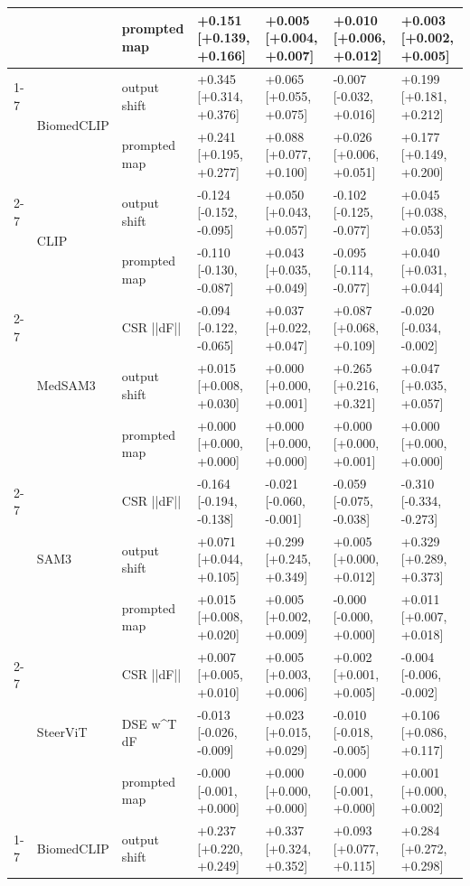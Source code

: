 \begin{tabular}{lllllll}
 &  & prompted map & +0.151 [+0.139, +0.166] & +0.005 [+0.004, +0.007] & +0.010 [+0.006, +0.012] & +0.003 [+0.002, +0.005] \\
\cline{1-7} \cline{2-7}
\multirow[t]{13}{*}{busi} & \multirow[t]{2}{*}{BiomedCLIP} & output shift & +0.345 [+0.314, +0.376] & +0.065 [+0.055, +0.075] & -0.007 [-0.032, +0.016] & +0.199 [+0.181, +0.212] \\
 &  & prompted map & +0.241 [+0.195, +0.277] & +0.088 [+0.077, +0.100] & +0.026 [+0.006, +0.051] & +0.177 [+0.149, +0.200] \\
\cline{2-7}
 & \multirow[t]{2}{*}{CLIP} & output shift & -0.124 [-0.152, -0.095] & +0.050 [+0.043, +0.057] & -0.102 [-0.125, -0.077] & +0.045 [+0.038, +0.053] \\
 &  & prompted map & -0.110 [-0.130, -0.087] & +0.043 [+0.035, +0.049] & -0.095 [-0.114, -0.077] & +0.040 [+0.031, +0.044] \\
\cline{2-7}
 & \multirow[t]{3}{*}{MedSAM3} & CSR  ||dF|| & -0.094 [-0.122, -0.065] & +0.037 [+0.022, +0.047] & +0.087 [+0.068, +0.109] & -0.020 [-0.034, -0.002] \\
 &  & output shift & +0.015 [+0.008, +0.030] & +0.000 [+0.000, +0.001] & +0.265 [+0.216, +0.321] & +0.047 [+0.035, +0.057] \\
 &  & prompted map & +0.000 [+0.000, +0.000] & +0.000 [+0.000, +0.000] & +0.000 [+0.000, +0.001] & +0.000 [+0.000, +0.000] \\
\cline{2-7}
 & \multirow[t]{3}{*}{SAM3} & CSR  ||dF|| & -0.164 [-0.194, -0.138] & -0.021 [-0.060, -0.001] & -0.059 [-0.075, -0.038] & -0.310 [-0.334, -0.273] \\
 &  & output shift & +0.071 [+0.044, +0.105] & +0.299 [+0.245, +0.349] & +0.005 [+0.000, +0.012] & +0.329 [+0.289, +0.373] \\
 &  & prompted map & +0.015 [+0.008, +0.020] & +0.005 [+0.002, +0.009] & -0.000 [-0.000, +0.000] & +0.011 [+0.007, +0.018] \\
\cline{2-7}
 & \multirow[t]{3}{*}{SteerViT} & CSR  ||dF|| & +0.007 [+0.005, +0.010] & +0.005 [+0.003, +0.006] & +0.002 [+0.001, +0.005] & -0.004 [-0.006, -0.002] \\
 &  & DSE  w^T dF & -0.013 [-0.026, -0.009] & +0.023 [+0.015, +0.029] & -0.010 [-0.018, -0.005] & +0.106 [+0.086, +0.117] \\
 &  & prompted map & -0.000 [-0.001, +0.000] & +0.000 [+0.000, +0.000] & -0.000 [-0.001, +0.000] & +0.001 [+0.000, +0.002] \\
\cline{1-7} \cline{2-7}
\multirow[t]{13}{*}{isic} & \multirow[t]{2}{*}{BiomedCLIP} & output shift & +0.237 [+0.220, +0.249] & +0.337 [+0.324, +0.352] & +0.093 [+0.077, +0.115] & +0.284 [+0.272, +0.298] \\

\end{tabular}

